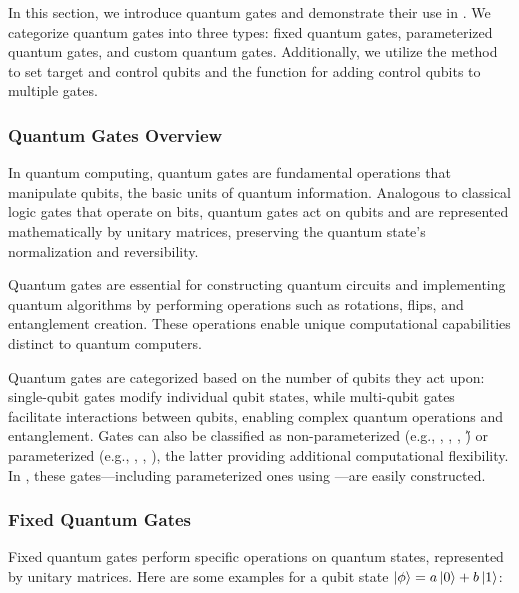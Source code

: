 In this section, we introduce quantum gates and demonstrate their use in \MindQuantum. We categorize quantum gates into three types: fixed quantum gates, parameterized quantum gates, and custom quantum gates. Additionally, we utilize the  method to set target and control qubits and the  function for adding control qubits to multiple gates.

\subsubsection{Quantum Gates Overview}

In quantum computing, quantum gates are fundamental operations that manipulate qubits, the basic units of quantum information. Analogous to classical logic gates that operate on bits, quantum gates act on qubits and are represented mathematically by unitary matrices, preserving the quantum state's normalization and reversibility.

Quantum gates are essential for constructing quantum circuits and implementing quantum algorithms by performing operations such as rotations, flips, and entanglement creation. These operations enable unique computational capabilities distinct to quantum computers.

Quantum gates are categorized based on the number of qubits they act upon: single-qubit gates modify individual qubit states, while multi-qubit gates facilitate interactions between qubits, enabling complex quantum operations and entanglement. Gates can also be classified as non-parameterized (e.g., \X, \Y, \Z, \H) or parameterized (e.g., \RX, \RY, \RZ), the latter providing additional computational flexibility. In \MindQuantum, these gates—including parameterized ones using \ParameterResolver—are easily constructed.

\subsubsection{Fixed Quantum Gates}
Fixed quantum gates perform specific operations on quantum states, represented by unitary matrices. Here are some examples for a qubit state $\ket{\phi}=a\ket{0}+b\ket{1}$:

